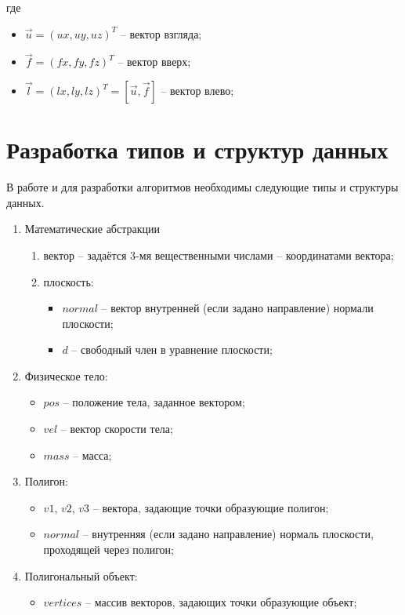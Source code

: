где
\begin{itemize}
	\item $\vec{u} = (ux, uy, uz)^T$ -- вектор взгляда;
	\item $\vec{f} = (fx, fy, fz)^T$ -- вектор вверх;
	\item $\vec{l} = (lx, ly, lz)^T = [\vec{u}, \vec{f}]$ -- вектор влево;
\end{itemize}

\section{Разработка типов и структур данных}

В работе и для разработки алгоритмов необходимы следующие типы и структуры данных.

\begin{enumerate}
	\item Математические абстракции
	\begin{enumerate}
		\item вектор -- задаётся 3-мя вещественными числами -- координатами вектора;
		\item плоскость:
		\begin{itemize}
			\item $normal$ -- вектор внутренней (если задано направление) нормали плоскости;
			\item $d$ -- свободный член в уравнение плоскости;
		\end{itemize}
	\end{enumerate}
	\item Физическое тело:
	\begin{itemize}
		\item $pos$ -- положение тела, заданное вектором;
		\item $vel$ -- вектор скорости тела;
		\item $mass$ -- масса;
	\end{itemize}
	\item Полигон:
	\begin{itemize}
		\item $v1$, $v2$, $v3$ -- вектора, задающие точки образующие полигон;
		\item $normal$ -- внутренняя (если задано направление) нормаль плоскости, проходящей через полигон;
	\end{itemize}
	\item Полигональный объект:
	\begin{itemize}
		\item $vertices$ -- массив векторов, задающих точки образующие объект;

\end{itemize}
\end{enumerate}
